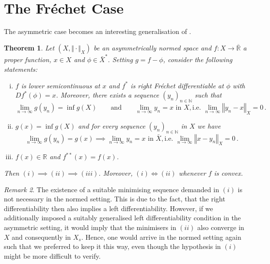 \documentclass[
	paper=A4,
	pagesize=auto,
	fontsize=12pt
]{scrartcl}
\theoremstyle{plain}
\newtheorem{theorem}{Theorem}[section]
\theoremstyle{remark}
\newtheorem{remark}[theorem]{Remark}
\theoremstyle{definition}
\begin{document}
\section{The Fréchet Case}
%
The asymmetric case becomes an interesting generalisation of \cite[Theorem 3.9.1]{src:Zalinescu:ConvexAnalysisInGeneralVectorSpaces}.
%
\begin{theorem}
\label{thm:FrechetCase}
Let $(X, \Vert \cdot \Vert_X)$ be an asymmetrically normed space and $f : X \to \overline{\mathbb{R}}$ a proper function, $x \in X$ and $\phi \in \bar{X}^*$.
Setting $g = f - \phi$, consider the following statements:
%
\begin{enumerate}[(i)]
\item $f$ is lower semicontinuous at $x$ and $f^*$ is right Fréchet differentiable at $\phi$ with $D f^* (\phi) = x$.
Moreover, there exists a sequence $(y_n)_{n \in \mathbb{N}}$ such that
\begin{equation}
\lim_{n \to \infty} g(y_n) = \inf g(X) \qquad\text{and}\qquad \lim_{n \to \infty} y_n = x \text{ in } X, \text{i.e. } \lim_{n \to \infty} \left\Vert y_n - x \right\Vert_X = 0 \, .
\end{equation}
\item $g(x) =  \inf g(X)$ and for every sequence $(y_n)_{n \in \mathbb{N}}$ in $X$ we have
\begin{equation}
 \lim_{n \to \infty} g(y_n) = g(x) \implies \lim_{n \to \infty} y_n = x \text{ in } \bar{X}, \text{i.e. } \lim_{n \to \infty} \left\Vert x - y_n \right\Vert_X = 0 \, .
\end{equation}
\item $f(x) \in \mathbb{R}$ and $f^{**}(x) = f(x)$.
\end{enumerate}
%
Then $(i) \implies (ii) \implies (iii)$.
Moreover, $(i) \iff (ii)$ whenever $f$ is convex.
\end{theorem}
%
\begin{remark}
\label{rem:WhyNotLeftDiffability}
The existence of a suitable minimising sequence demanded in $(i)$ is not necessary in the normed setting.
This is due to the fact, that the right differentiability then also implies a left differentiability.
However, if we additionally imposed a suitably generalised left differentiability condition in the asymmetric setting, it would imply that the minimisers in $(ii)$ also converge in $X$ and consequently in $X_s$.
Hence, one would arrive in the normed setting again such that we preferred to keep it this way, even though the hypothesis in $(i)$ might be more difficult to verify.
\end{remark}
\end{document}
